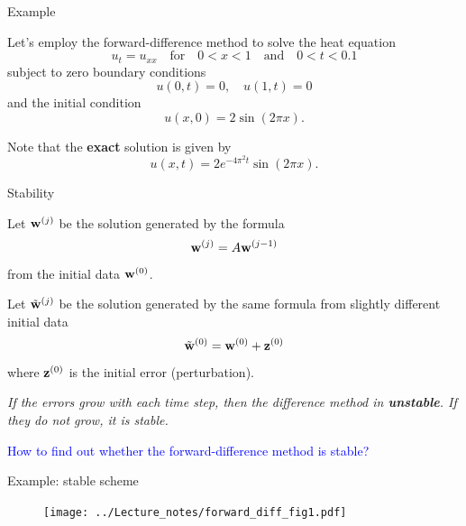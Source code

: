 \documentclass{beamer}
\begin{document}


\begin{frame}{Example}

{\small
Let's employ the forward-difference method to solve the heat equation
\[
u_{t}=u_{xx} \quad \textrm{for} \quad 0<x<1  \quad \textrm{and} \quad 0<t<0.1
\]
subject to zero boundary conditions
\[
u(0,t)=0, \quad u(1,t)=0
\]
and the initial condition
\[
u(x,0)=2\sin(2\pi x).
\]

\vskip 5mm
Note that the \textbf{exact} solution is given by
\[
u(x,t)=2e^{-4\pi^2 t}\sin(2\pi x).
\]

}
\end{frame}

\begin{frame}{Stability}

{\small Let ${\bf w}^{(j)}$ be the solution generated by the formula
\[
{\bf w}^{(j)}=A{\bf w}^{(j-1)}
\]
from the initial data ${\bf w}^{(0)}$.

\vskip 3mm

Let $\tilde{\bf w}^{(j)}$ be the solution generated by the same formula from slightly different
initial data
\[
\tilde{\bf w}^{(0)}={\bf w}^{(0)}+{\bf z}^{(0)}
\]
where ${\bf z}^{(0)}$ is the initial error (perturbation).

\vskip 3mm

\textit{If the errors grow with each time step, then the
difference method in \textbf{unstable}. If they do not grow, it is stable.}

\vskip 3mm

\textcolor{blue}{How to find out whether the forward-difference method is stable?}
}

\end{frame}



\begin{frame}{Example: stable scheme}
\begin{figure}[h]
\centering
\texttt{[image: ../Lecture\_notes/forward\_diff\_fig1.pdf]}
\end{figure}


\end{frame}

\end{document}
